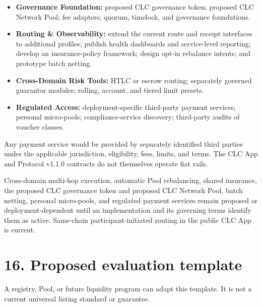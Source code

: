 \documentclass[11pt]{article}
\begin{document}
\begin{itemize}[leftmargin=*]
\item \textbf{Governance Foundation:} proposed CLC governance token; proposed CLC Network Pool; fee adapters; quorum, timelock, and governance foundations.
\item \textbf{Routing \& Observability:} extend the current route and receipt interfaces to additional profiles; publish health dashboards and service-level reporting; develop an insurance-policy framework; design opt-in rebalance intents; and prototype batch netting.
\item \textbf{Cross-Domain Risk Tools:} HTLC or escrow routing; separately governed guarantor modules; rolling, account, and tiered limit presets.
\item \textbf{Regulated Access:} deployment-specific third-party payment services; personal micro-pools; compliance-service discovery; third-party audits of voucher classes.
\end{itemize}
Any payment service would be provided by separately identified third parties under the applicable jurisdiction, eligibility, fees, limits, and terms. The CLC App and Protocol v1.1.0 contracts do not themselves operate fiat rails.

Cross-domain multi-hop execution, automatic Pool rebalancing, shared insurance, the proposed CLC governance token and proposed CLC Network Pool, batch netting, personal micro-pools, and regulated payment services remain proposed or deployment-dependent until an implementation and its governing terms identify them as active. Same-chain participant-initiated routing in the public CLC App is current.


\section*{16. Proposed evaluation template}

A registry, Pool, or future liquidity program can adapt this template. It is not a current universal listing standard or guarantee.
\end{document}
